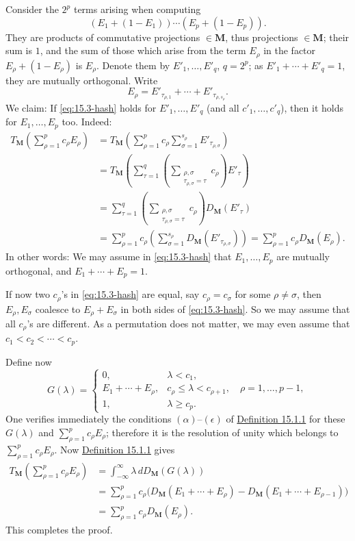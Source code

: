 \documentclass[12pt,b5paper,twoside]{article}
\newcommand{\M}{\mathbf M}
\newcommand{\defref}[1]{\hyperref[def:#1]{Definition #1}}
\begin{document}
Consider the \(2^p\) terms arising when computing
\[
(E_1+(1-E_1))\cdots(E_p+(1-E_p)).
\]
They are products of commutative projections \(\in\M\), thus projections
\(\in\M\); their sum is \(1\), and the sum of those which arise from the term
\(E_\rho\) in the factor \(E_\rho+(1-E_\rho)\) is \(E_\rho\). Denote them
by \(E'_1,\ldots,E'_q\), \(q=2^p\); as
\(E'_1+\cdots+E'_q=1\), they are mutually orthogonal. Write
\[
E_\rho=E'_{\tau_{\rho,1}}+\cdots+E'_{\tau_{\rho,s_\rho}}.
\]
We claim: If \eqref{eq:15.3-hash} holds for \(E'_1,\ldots,E'_q\) (and all
\(c'_1,\ldots,c'_q\)), then it holds for \(E_1,\ldots,E_p\) too. Indeed:
\[
\begin{aligned}
T_{\M}\left(\sum_{\rho=1}^pc_\rho E_\rho\right)
 &=T_{\M}\left(\sum_{\rho=1}^pc_\rho
       \sum_{\sigma=1}^{s_\rho}E'_{\tau_{\rho,\sigma}}\right)\\
 &=T_{\M}\left(\sum_{\tau=1}^q
       \left(\sum_{\substack{\rho,\sigma\\
              \tau_{\rho,\sigma}=\tau}}c_\rho\right)E'_\tau\right)\\
 &=\sum_{\tau=1}^q
       \left(\sum_{\substack{\rho,\sigma\\
              \tau_{\rho,\sigma}=\tau}}c_\rho\right)D_{\M}(E'_\tau)\\
 &=\sum_{\rho=1}^pc_\rho
       \left(\sum_{\sigma=1}^{s_\rho}D_{\M}(E'_{\tau_{\rho,\sigma}})\right)
  =\sum_{\rho=1}^pc_\rho D_{\M}(E_\rho).
\end{aligned}
\]
In other words: We may assume in \eqref{eq:15.3-hash} that
\(E_1,\ldots,E_p\) are mutually orthogonal, and
\(E_1+\cdots+E_p=1\).

If now two \(c_\rho\)'s in \eqref{eq:15.3-hash} are equal, say
\(c_\rho=c_\sigma\) for some \(\rho\ne\sigma\), then \(E_\rho,E_\sigma\)
coalesce to \(E_\rho+E_\sigma\) in both sides of \eqref{eq:15.3-hash}.
So we may assume that all \(c_\rho\)'s are different. As a permutation does
not matter, we may even assume that \(c_1<c_2<\cdots<c_p\).

Define now
\[
G(\lambda)=
\begin{cases}
0,&\lambda<c_1,\\
E_1+\cdots+E_\rho,&c_\rho\leq\lambda<c_{\rho+1},
  \quad\rho=1,\ldots,p-1,\\
1,&\lambda\geq c_p.
\end{cases}
\]
One verifies immediately the conditions \((\alpha)\)--\((\epsilon)\) of
\defref{15.1.1} for
these \(G(\lambda)\) and \(\sum_{\rho=1}^pc_\rho E_\rho\); therefore it is
the resolution of unity which belongs to \(\sum_{\rho=1}^pc_\rho E_\rho\).
Now \defref{15.1.1} gives
\[
\begin{aligned}
T_{\M}\left(\sum_{\rho=1}^pc_\rho E_\rho\right)
 &=\int_{-\infty}^{\infty}\lambda\,dD_{\M}(G(\lambda))\\
 &=\sum_{\rho=1}^pc_\rho
 \bigl(D_{\M}(E_1+\cdots+E_\rho)
       -D_{\M}(E_1+\cdots+E_{\rho-1})\bigr)\\
 &=\sum_{\rho=1}^pc_\rho D_{\M}(E_\rho).
\end{aligned}
\]
This completes the proof.
\end{document}
